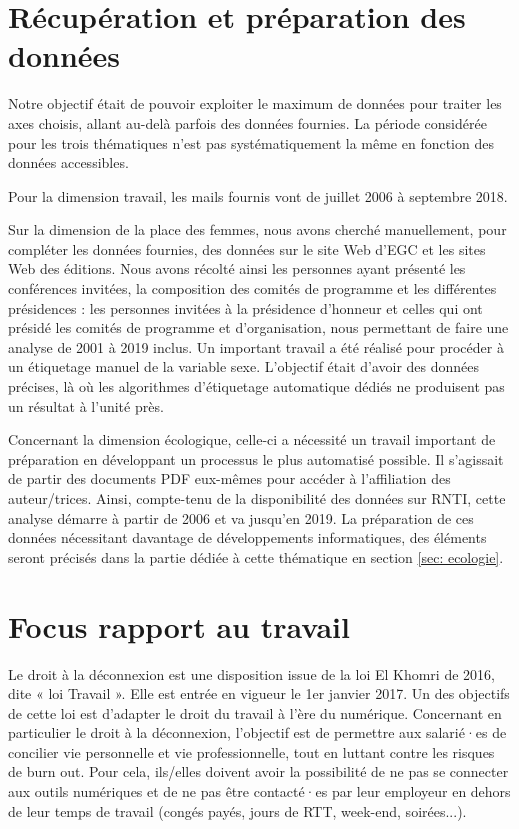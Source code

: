 \documentclass[a4paper,french]{rnti}
\begin{document}
\section{Récupération et préparation des 
données}\label{sec:recup-prepa-data}

Notre objectif était de pouvoir exploiter le maximum de données pour 
traiter les axes choisis, allant au-delà parfois des données fournies. La 
période considérée pour les trois thématiques n'est pas systématiquement 
la même en fonction des données accessibles.


Pour la dimension travail, les mails fournis vont de juillet 2006 à 
septembre 2018.

Sur la dimension de la place des femmes, nous avons cherché manuellement, 
pour compléter les données fournies, des données sur le site Web d'EGC et 
les sites Web des éditions. Nous avons récolté ainsi les personnes ayant 
présenté les conférences invitées, la composition des comités de programme 
et les différentes présidences : les personnes invitées à la présidence 
d'honneur et celles qui ont présidé les comités de programme et 
d'organisation, nous permettant de faire une analyse de 2001 à 2019 
inclus. Un important travail a été réalisé pour procéder à un étiquetage 
manuel de la variable sexe. L'objectif était d'avoir des données précises, 
là où les algorithmes d'étiquetage automatique dédiés ne produisent pas un 
résultat à l'unité près.




Concernant la dimension écologique, celle-ci a nécessité un travail 
important de préparation en développant un processus le plus automatisé 
possible. Il s'agissait de partir des documents PDF eux-mêmes pour accéder 
à l'affiliation des auteur/trices.
Ainsi, compte-tenu de la disponibilité des données sur RNTI, cette analyse 
démarre à partir de 2006 et va jusqu'en 2019. La préparation de ces 
données nécessitant davantage de développements informatiques, des 
éléments seront précisés dans la partie dédiée à cette thématique en 
section \ref{sec: ecologie}.



\section{Focus rapport au travail}\label{sec: rapport_travail}




Le droit à la déconnexion est une disposition issue de la loi El Khomri de 
2016, dite « loi Travail ». Elle est entrée en vigueur le 1er janvier 
2017. Un des objectifs de cette loi est d'adapter le droit du travail à 
l'ère du numérique.  Concernant en particulier le droit à la déconnexion, 
l'objectif est de permettre aux salarié·es de concilier vie personnelle et 
vie professionnelle, tout en luttant contre les risques de burn out. Pour 
cela, ils/elles doivent avoir la possibilité de ne pas se connecter aux 
outils numériques et de ne pas être contacté·es par leur employeur en 
dehors de leur temps de travail (congés payés, jours de RTT, week-end, 
soirées...). 
\end{document}
